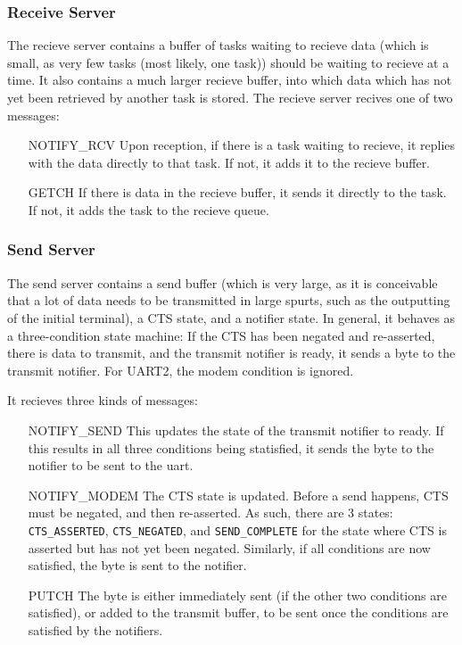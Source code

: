 \documentclass{article}
\begin{document}
\subsubsection{Receive Server}
The recieve server contains a buffer of tasks waiting to recieve data (which is small, as very few tasks (most likely, one task)) should be waiting to recieve at a time. It also contains a much larger recieve buffer, into which data which has not yet been retrieved by another task is stored.
The recieve server recives one of two messages:
\begin{enumerate}
    \item[NOTIFY\_RCV] Upon reception, if there is a task waiting to recieve, it replies with the data directly to that task. If not, it adds it to the recieve buffer.
    \item[GETCH] If there is data in the recieve buffer, it sends it directly to the task. If not, it adds the task to the recieve queue.
\end{enumerate}
\subsubsection{Send Server}
The send server contains a send buffer (which is very large, as it is conceivable that a lot of data needs to be transmitted in large spurts, such as the outputting of the initial terminal), a CTS state, and a notifier state. In general, it behaves as a three-condition state machine: If the CTS has been negated and re-asserted, there is data to transmit, and the transmit notifier is ready, it sends a byte to the transmit notifier. For UART2, the modem condition is ignored.

It recieves three kinds of messages:
\begin{enumerate}
    \item[NOTIFY\_SEND] This updates the state of the transmit notifier to ready. If this results in all three conditions being statisfied, it sends the byte to the notifier to be sent to the uart.
    \item[NOTIFY\_MODEM] The CTS state is updated. Before a send happens, CTS must be negated, and then re-asserted. As such, there are 3 states: \verb|CTS_ASSERTED|, \verb|CTS_NEGATED|, and \verb|SEND_COMPLETE| for the state where CTS is asserted but has not yet been negated. Similarly, if all conditions are now satisfied, the byte is sent to the notifier.
    \item[PUTCH] The byte is either immediately sent (if the other two conditions are satisfied), or added to the transmit buffer, to be sent once the conditions are satisfied by the notifiers.
\end{enumerate}
\end{document}
